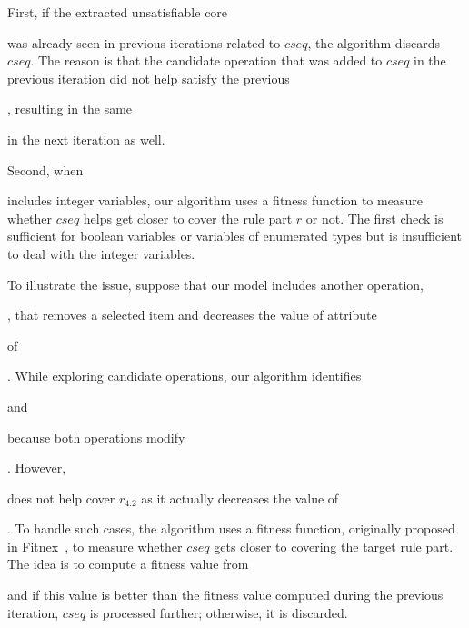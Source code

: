 First, if the extracted unsatisfiable core \subject{ucore} was already seen in
previous iterations related to $cseq$, the algorithm discards $cseq$. The reason
is that the candidate operation that was added to $cseq$ in the previous
iteration did not help satisfy the previous \subject{ucore}, resulting in the
same \subject{ucore} in the next iteration as well.

Second, when \subject{ucore} includes integer variables, our algorithm uses a
fitness function to measure whether $cseq$ helps get closer to cover the rule
part $r$ or not. The first check is sufficient for boolean variables or
variables of enumerated types but is insufficient to deal with the integer
variables.

To illustrate the issue, suppose that our model includes another operation,
\subject{RemoveItemFromOrder}, that removes a selected item and decreases the
value of attribute \subject{total} of \subject{Order}. While exploring candidate
operations, our algorithm identifies \subject{AddItemToOrder} and
\subject{RemoveItemFromOrder} because both operations modify
\subject{total}. However, \subject{RemoveItemFromOrder} does not help cover
$r_{4.2}$ as it actually decreases the value of \subject{total}. To handle such
cases, the algorithm uses a fitness function, originally proposed in
Fitnex~\cite{xie09:fitness}, to measure whether $cseq$ gets closer to covering
the target rule part. The idea is to compute a fitness value from
\subject{ucore} and if this value is better than the fitness value computed
during the previous iteration, $cseq$ is processed further; otherwise, it is
discarded.
